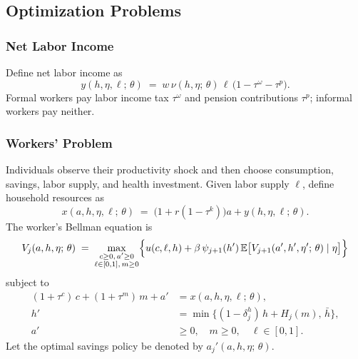 \documentclass[12pt,a4paper]{article}
\newcommand{\E}{\mathbb{E}}
\begin{document}
\subsection{Optimization Problems}
\label{subsec:optimization}

\subsubsection{Net Labor Income}
\label{subsubsec:net_income}

Define net labor income as
\begin{equation}
\label{eq:net_labor_income}
y(h, \eta, \ell;\, \theta) \;=\; w\, \nu(h, \eta;\, \theta)\, \ell\, \bigl(1 - \tau^\omega - \tau^p\bigr).
\end{equation}
Formal workers pay labor income tax $\tau^\omega$ and pension contributions $\tau^p$; informal workers pay neither.

\subsubsection{Workers' Problem}
\label{subsubsec:worker}

Individuals observe their productivity shock and then choose consumption, savings, labor supply, and health investment. Given labor supply $\ell$, define household resources as
\begin{equation}
\label{eq:resources_worker}
x(a, h, \eta, \ell;\, \theta) \;=\; \bigl(1 + r(1 - \tau^k)\bigr) a + y(h, \eta, \ell;\, \theta).
\end{equation}
The worker's Bellman equation is
\begin{equation}
\label{eq:worker_bellman}
V_j(a, h, \eta;\, \theta)
\;=\;
\max_{\substack{c \geq 0,\, a' \geq 0 \\ \ell \in [0,1],\, m \geq 0}}
\Bigl\{
u(c, \ell, h)
+ \beta\, \psi_{j+1}(h')\,
\E\bigl[V_{j+1}(a', h', \eta';\, \theta) \mid \eta\bigr]
\Bigr\}
\end{equation}
subject to
\begin{align}
(1 + \tau^c)\, c + (1 + \tau^m)\, m + a' &= x(a, h, \eta, \ell;\, \theta), \label{eq:worker_budget}\\
h' &= \min\bigl\{(1 - \delta_j^h)\, h + H_j(m),\, \bar h\bigr\}, \label{eq:worker_health}\\
a' &\geq 0,\quad m \geq 0,\quad \ell \in [0,1]. \label{eq:worker_borrow}
\end{align}
Let the optimal savings policy be denoted by $a_j'(a, h, \eta;\, \theta)$.
\end{document}
